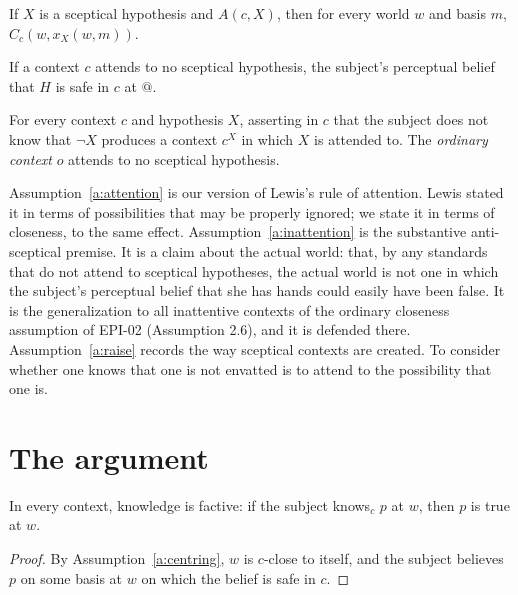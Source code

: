 \documentclass{situationist-preprint}
\begin{document}
\begin{assumption}\label{a:attention}
If $X$ is a sceptical hypothesis and $A(c,X)$, then for every world $w$ and basis $m$, $C_c(w, x_X(w,m))$.
\end{assumption}

\begin{assumption}[Inattention]\label{a:inattention}
If a context $c$ attends to no sceptical hypothesis, the subject's perceptual belief that $H$ is safe in $c$ at $@$.
\end{assumption}

\begin{assumption}[Raising]\label{a:raise}
For every context $c$ and hypothesis $X$, asserting in $c$ that the subject does not know that $\neg X$ produces a context $c^{X}$ in which $X$ is attended to. The \emph{ordinary context} $o$ attends to no sceptical hypothesis.
\end{assumption}

Assumption~\ref{a:attention} is our version of Lewis's rule of attention. Lewis stated it in terms of possibilities that may be properly ignored; we state it in terms of closeness, to the same effect. Assumption~\ref{a:inattention} is the substantive anti-sceptical premise. It is a claim about the actual world: that, by any standards that do not attend to sceptical hypotheses, the actual world is not one in which the subject's perceptual belief that she has hands could easily have been false. It is the generalization to all inattentive contexts of the ordinary closeness assumption of EPI-02 (Assumption 2.6), and it is defended there. Assumption~\ref{a:raise} records the way sceptical contexts are created. To consider whether one knows that one is not envatted is to attend to the possibility that one is.

\section{The argument}

\begin{lemma}[Factivity]\label{l:factive}
In every context, knowledge is factive: if the subject knows$_c$ $p$ at $w$, then $p$ is true at $w$.
\end{lemma}

\begin{proof}
By Assumption~\ref{a:centring}, $w$ is $c$-close to itself, and the subject believes $p$ on some basis at $w$ on which the belief is safe in $c$.
\end{proof}
\end{document}
